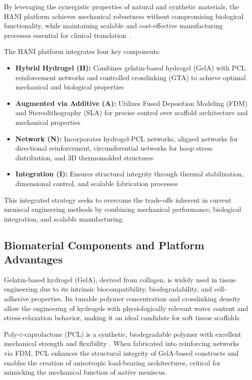 By leveraging the synergistic properties of natural and synthetic materials, the HANI platform achieves mechanical robustness without compromising biological functionality, while maintaining scalable and cost-effective manufacturing processes essential for clinical translation~\cite{sun2017overviewscaffold, luis20203ddirect, bahcecioglu20193dprinted}.

The HANI platform integrates four key components:

\begin{itemize}
    \item \textbf{Hybrid Hydrogel (H):} Combines gelatin-based hydrogel (GelA) with PCL reinforcement networks and controlled crosslinking (GTA) to achieve optimal mechanical and biological properties
    \item \textbf{Augmented via Additive (A):} Utilizes Fused Deposition Modeling (FDM) and Stereolithography (SLA) for precise control over scaffold architecture and mechanical properties
    \item \textbf{Network (N):} Incorporates hydrogel-PCL networks, aligned networks for directional reinforcement, circumferential networks for hoop stress distribution, and 3D thermomolded structures
    \item \textbf{Integration (I):} Ensures structural integrity through thermal stabilization, dimensional control, and scalable fabrication processes
\end{itemize}

This integrated strategy seeks to overcome the trade-offs inherent in current meniscal engineering methods by combining mechanical performance, biological integration, and scalable manufacturing.

\subsection{Biomaterial Components and Platform Advantages}

Gelatin-based hydrogel (GelA), derived from collagen, is widely used in tissue engineering due to its intrinsic biocompatibility, biodegradability, and cell-adhesive properties. Its tunable polymer concentration and crosslinking density allow the engineering of hydrogels with physiologically relevant water content and stress-relaxation behavior, making it an ideal candidate for soft tissue scaffolds.

Poly-$\varepsilon$-caprolactone (PCL) is a synthetic, biodegradable polymer with excellent mechanical strength and flexibility \cite{cipitria2011designfabrication}. When fabricated into reinforcing networks via FDM, PCL enhances the structural integrity of GelA-based constructs and enables the creation of anisotropic load-bearing architectures, critical for mimicking the mechanical function of native meniscus.


